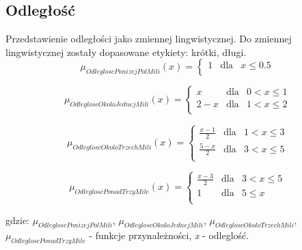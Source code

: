 \documentclass{classrep}
\begin{document}
\subsection{Odległość}

Przedstawienie odległości jako zmiennej lingwistycznej. Do zmiennej lingwistycznej zostały dopasowane etykiety: krótki, długi. 
\begin{equation}
\mu _{OdlegloscPonizejPolMili}(x) =  \left\{ \begin{array}{rcl}
 1 & \mbox{dla} & x  \leq 0.5 \\
\end{array}\right.
\end{equation}

\begin{equation}
\mu _{OdlegloscOkoloJednejMili}(x) =  \left\{ \begin{array}{rcl}
x & \mbox{dla} & 0 < x \leq 1\\
2 - x & \mbox{dla} & 1 < x \leq 2\\
\end{array}\right.
\end{equation}

\begin{equation}
\mu _{OdlegloscOkoloTrzechMili}(x) =  \left\{ \begin{array}{rcl}
\frac{x - 1}{2} & \mbox{dla} & 1 < x \leq 3\\
\frac{5 - x}{2} & \mbox{dla} & 3 < x \leq 5\\
\end{array}\right.
\end{equation}

\begin{equation}
\mu _{OdlegloscPonadTrzyMile}(x) =  \left\{ \begin{array}{rcl}
\frac{x - 3}{2} & \mbox{dla} & 3 < x \leq 5\\
1 & \mbox{dla} & 5 \leq x \\
\end{array}\right.
\end{equation}

gdzie: \(\mu _{OdlegloscPonizejPolMili}\), \(\mu _{OdlegloscOkoloJednejMili}\), \(\mu _{OdlegloscOkoloTrzechMili}\), \(\mu _{OdlegloscPonadTrzyMile}\) - funkcje przynależności, \textit{x} - odleglość. 
\end{document}
